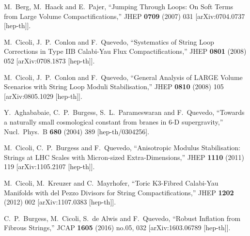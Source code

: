 \documentclass[11pt,a4paper]{article}
\begin{document}
\begin{thebibliography}{99}
  M.~Berg, M.~Haack and E.~Pajer,
  ``Jumping Through Loops: On Soft Terms from Large Volume Compactifications,''
  JHEP {\bf 0709} (2007) 031
  [arXiv:0704.0737 [hep-th]].


  M.~Cicoli, J.~P.~Conlon and F.~Quevedo,
  ``Systematics of String Loop Corrections in Type IIB Calabi-Yau Flux Compactifications,''
  JHEP {\bf 0801} (2008) 052
  [arXiv:0708.1873 [hep-th]].


  M.~Cicoli, J.~P.~Conlon and F.~Quevedo,
  ``General Analysis of LARGE Volume Scenarios with String Loop Moduli Stabilisation,''
  JHEP {\bf 0810} (2008) 105
  [arXiv:0805.1029 [hep-th]].


  Y.~Aghababaie, C.~P.~Burgess, S.~L.~Parameswaran and F.~Quevedo,
  ``Towards a naturally small cosmological constant from branes in 6-D supergravity,''
  Nucl.\ Phys.\ B {\bf 680} (2004) 389
  [hep-th/0304256].


  M.~Cicoli, C.~P.~Burgess and F.~Quevedo,
  ``Anisotropic Modulus Stabilisation: Strings at LHC Scales with Micron-sized Extra-Dimensions,''
  JHEP {\bf 1110} (2011) 119
  [arXiv:1105.2107 [hep-th]].


  M.~Cicoli, M.~Kreuzer and C.~Mayrhofer,
  ``Toric K3-Fibred Calabi-Yau Manifolds with del Pezzo Divisors for String Compactifications,''
  JHEP {\bf 1202} (2012) 002
  [arXiv:1107.0383 [hep-th]].


  C.~P.~Burgess, M.~Cicoli, S.~de Alwis and F.~Quevedo,
  ``Robust Inflation from Fibrous Strings,''
  JCAP {\bf 1605} (2016) no.05,  032
  [arXiv:1603.06789 [hep-th]].



\end{thebibliography}
\end{document}

